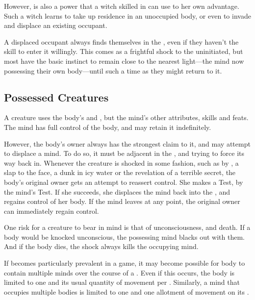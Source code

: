 However, {\possession} is also a power that a witch skilled in  can use to her own advantage.
Such a witch learns to take up residence in an unoccupied body, or even to invade and displace an existing occupant.

A displaced occupant always finds themselves in the {\mentalrealm}, even if they haven't the skill to enter it willingly.
This comes as a frightful shock to the uninitiated, but most have the basic instinct to remain close to the nearest light---the mind now possessing their own body---until such a time as they might return to it.

\subsection{Possessed Creatures}

A {\possessed} creature uses the body's  and , but the {\possessing} mind's other attributes, skills and feats.
The {\possessing} mind has full control of the body, and may retain it indefinitely.

However, the body's owner always has the strongest claim to it, and may attempt to displace a {\possessing} mind.
To do so, it must be adjacent in the {\mentalrealm}, and trying to force its way back in.
Whenever the {\possessing} creature is shocked in some fashion, such as by {\damage}, a slap to the face, a dunk in icy water or the revelation of a terrible secret, the body's original owner gets an attempt to reassert control.
She makes a  Test, {\opposed} by the {\possessing} mind's  Test.
If she succeeds, she displaces the {\possessing} mind back into the {\mentalrealm}, and regains control of her body.
If the {\possessing} mind leaves at any point, the original owner can immediately regain control.

One risk for a {\possessing} creature to bear in mind is that of unconsciousness, and death.
If a body would be knocked unconscious, the possessing mind blacks out with them.
And if the body dies, the shock always kills the occupying mind.

If {\possession} becomes particularly prevalent in a game, it may become possible for body to contain multiple minds over the course of a {\round}.
Even if this occurs, the body is limited to one {\action} and its usual quantity of movement per {\round}.
Similarly, a mind that occupies multiple bodies is limited to one {\action} and one allotment of movement on its {\turn}.

